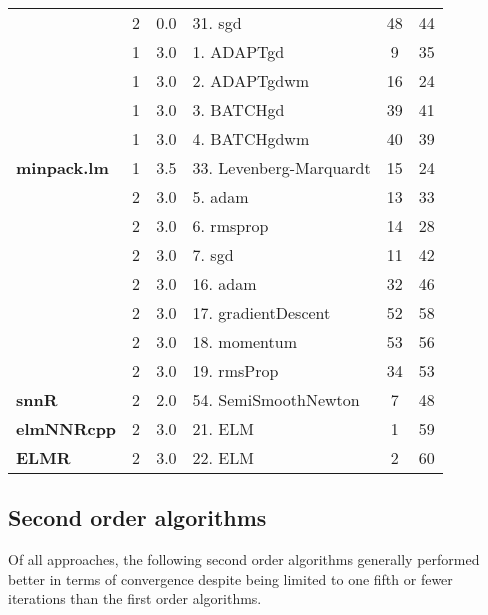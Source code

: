 \begin{Schunk}
\begin{table}
\begin{tabular}[t]{>{\bfseries}lcclcc}
\multirow{-7}{*}{\raggedright\arraybackslash keras} & 2 & 0.0 & 31. sgd & 48 & 44\\
\cmidrule{1-6}
 & 1 & 3.0 & 1. ADAPTgd & 9 & 35\\

 & 1 & 3.0 & 2. ADAPTgdwm & 16 & 24\\

 & 1 & 3.0 & 3. BATCHgd & 39 & 41\\

\multirow{-4}{*}{\raggedright\arraybackslash AMORE} & 1 & 3.0 & 4. BATCHgdwm & 40 & 39\\
\cmidrule{1-6}
minpack.lm & 1 & 3.5 & 33. Levenberg-Marquardt & 15 & 24\\
\cmidrule{1-6}
 & 2 & 3.0 & 5. adam & 13 & 33\\

 & 2 & 3.0 & 6. rmsprop & 14 & 28\\

\multirow{-3}{*}{\raggedright\arraybackslash ANN2} & 2 & 3.0 & 7. sgd & 11 & 42\\
\cmidrule{1-6}
 & 2 & 3.0 & 16. adam & 32 & 46\\

 & 2 & 3.0 & 17. gradientDescent & 52 & 58\\

 & 2 & 3.0 & 18. momentum & 53 & 56\\

\multirow{-4}{*}{\raggedright\arraybackslash deepdive} & 2 & 3.0 & 19. rmsProp & 34 & 53\\
\cmidrule{1-6}
snnR & 2 & 2.0 & 54. SemiSmoothNewton & 7 & 48\\
\cmidrule{1-6}
elmNNRcpp & 2 & 3.0 & 21. ELM & 1 & 59\\
\cmidrule{1-6}
ELMR & 2 & 3.0 & 22. ELM & 2 & 60\\
\bottomrule
\end{tabular}
\end{table}

\end{Schunk}

\hypertarget{second-order-algorithms}{%
\subsection{Second order algorithms}\label{second-order-algorithms}}

Of all approaches, the following second order algorithms generally
performed better in terms of convergence despite being limited to one
fifth or fewer iterations than the first order algorithms.


